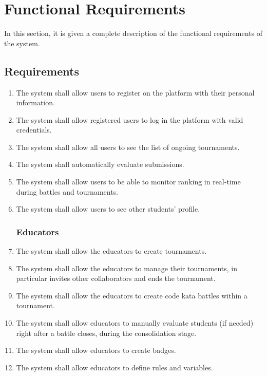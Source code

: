 \section{Functional Requirements}
In this section, it is given a complete description of the functional requirements of the system.

    \subsection{Requirements}
        \begin{enumerate}[label=\textbf{R.\arabic*}]
            \subsubsection*{Users}
            \item {} {The system shall allow users to register on the platform with their personal information.}
            \item {} {The system shall allow registered users to log in the platform with valid credentials.}
            \item {} {The system shall allow all users to see the list of ongoing tournaments.}
            \item {} {The system shall automatically evaluate submissions.}
            \item {} {The system shall allow users to be able to monitor ranking in real-time during battles and tournaments.}
            \item {} {The system shall allow users to see other students' profile.}
            
            \subsubsection*{Educators}
            \item {} {The system shall allow the educators to create tournaments.}
            \item {} {The system shall allow the educators to manage their tournaments, in particular invites other collaborators and ends the tournament.}
            \item {} {The system shall allow the educators to create code kata battles within a tournament.}
             \item {} {The system shall allow educators to manually evaluate students (if needed) right after a battle closes, during the consolidation stage.}
            \item {} {The system shall allow educators to create badges.}
            \item {} {The system shall allow educators to define rules and variables.}


\end{enumerate}
